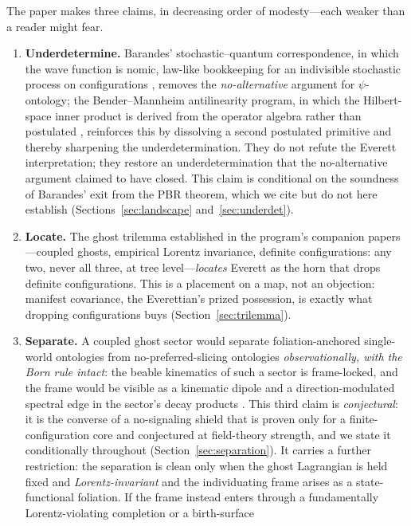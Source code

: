 \documentclass[11pt]{article}
\theoremstyle{remark}
\begin{document}
The paper makes three claims, in decreasing order of modesty---each
weaker than a reader might fear.

\begin{enumerate}
\item \textbf{Underdetermine.} Barandes' stochastic--quantum
correspondence, in which the wave function is nomic, law-like
bookkeeping for an indivisible stochastic process on configurations
\cite{BarandesPoP,BarandesTheorem}, removes the \emph{no-alternative}
argument for $\psi$-ontology; the Bender--Mannheim antilinearity
program, in which the Hilbert-space inner product is derived from the
operator algebra rather than postulated
\cite{BenderMannheim2008,Mannheim2020}, reinforces this by dissolving a
second postulated primitive and thereby sharpening the
underdetermination. They do not refute the Everett interpretation; they
restore an underdetermination that the no-alternative argument claimed
to have closed. This claim is
conditional on the soundness of Barandes' exit from the PBR theorem,
which we cite but do not here establish
(Sections~\ref{sec:landscape} and~\ref{sec:underdet}).
\item \textbf{Locate.} The ghost trilemma established in the
program's companion papers \cite{instantaneous,choosing}---coupled
ghosts, empirical Lorentz invariance, definite configurations: any
two, never all three, at tree level---\emph{locates} Everett as the
horn that drops definite configurations. This is a placement on a
map, not an objection: manifest covariance, the Everettian's prized
possession, is exactly what dropping configurations buys
(Section~\ref{sec:trilemma}).
\item \textbf{Separate.} A coupled ghost sector would separate
foliation-anchored single-world ontologies from no-preferred-slicing
ontologies \emph{observationally, with the Born rule intact}: the
beable kinematics of such a sector is frame-locked, and the frame
would be visible as a kinematic dipole and a direction-modulated
spectral edge in the sector's decay products
\cite{instantaneous}. This third claim is \emph{conjectural}: it is
the converse of a no-signaling shield that is proven only for a
finite-configuration core and conjectured at field-theory strength,
and we state it conditionally throughout
(Section~\ref{sec:separation}). It carries a further restriction: the
separation is clean only when the ghost Lagrangian is held fixed and
\emph{Lorentz-invariant} and the individuating frame arises as a
state-functional foliation. If the frame instead enters through a
fundamentally Lorentz-violating completion or a birth-surface

\end{enumerate}
\end{document}
